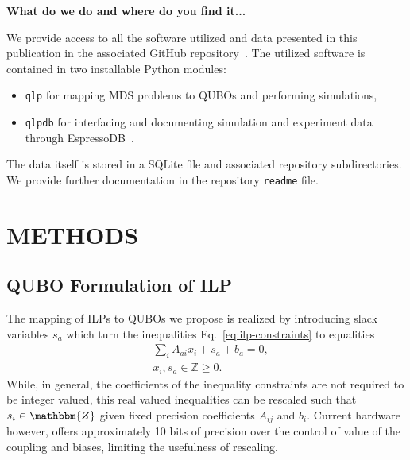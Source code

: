 \documentclass[10pt]{iopart}
\begin{document}
\textbf{What do we do and where do you find it...}


We provide access to all the software utilized and data presented in this publication in the associated GitHub repository~\cite{github:cchang5/quantum_linear_programming}.
The utilized software is contained in two installable Python modules:
\begin{itemize}[leftmargin=*]
    \itemsep0em
    \item[] \texttt{qlp} for mapping MDS problems to QUBOs and performing simulations,
    \item[] \texttt{qlpdb} for interfacing and documenting simulation and experiment data through EspressoDB~\cite{Chang:2019khk}.
\end{itemize}
The data itself is stored in a SQLite file and associated repository subdirectories.
We provide further documentation in the repository \texttt{readme} file.



\section{METHODS}
\label{sec:methods}

\subsection{QUBO Formulation of ILP}
\label{sec:results:qa1}

The mapping of ILPs to QUBOs we propose is realized by introducing slack variables $s_a$ which turn the inequalities Eq.~\eqref{eq:ilp-constraints} to equalities
\begin{align}
  \label{eq:ilp:slack}
  & \sum_i A_{a i}x_i + s_a + b_a = 0, \\
  & x_i, s_a \in \mathbb{Z} \geq 0.
\end{align}
While, in general, the coefficients of the inequality constraints are not required to be integer valued, this real valued inequalities can be rescaled such that $s_i \in \mathbbm{Z}$ given fixed precision coefficients $A_{ij}$ and $b_i$. Current hardware however, offers approximately 10 bits of precision over the control of value of the coupling and biases, limiting the usefulness of rescaling.
\end{document}
